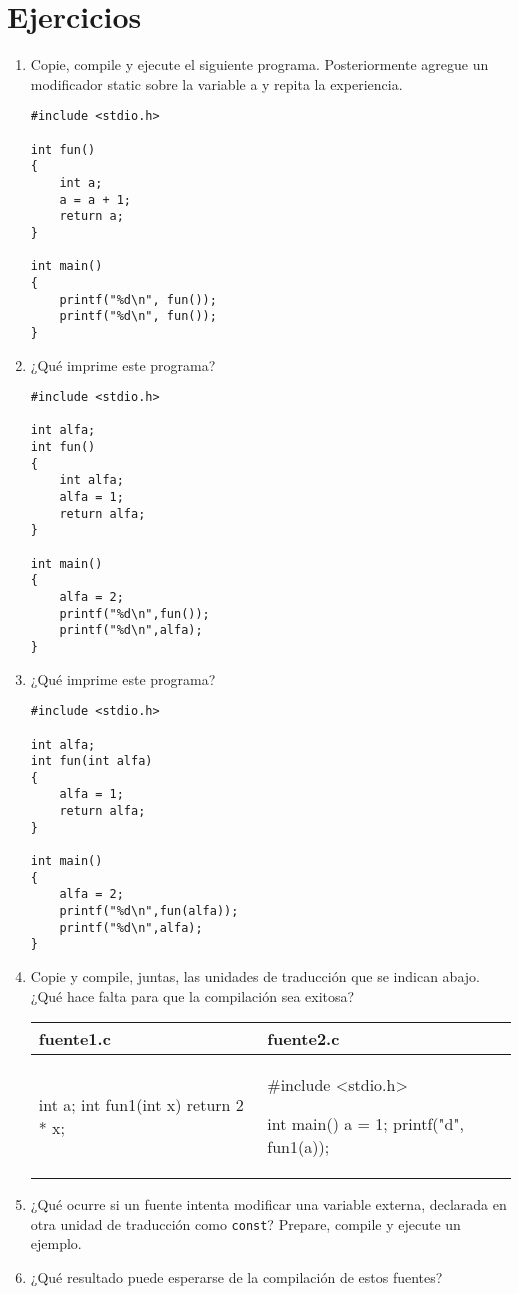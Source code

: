 \section{Ejercicios}
\label{sec:tc-variables-ej}
\begin{enumerate}
	\item Copie, compile y ejecute el siguiente programa. Posteriormente agregue un modificador static sobre
la variable a y repita la experiencia.
\begin{lstlisting}
#include <stdio.h>

int fun()
{
	int a;
	a = a + 1;
	return a;
}

int main()
{
	printf("%d\n", fun());
	printf("%d\n", fun());
}
\end{lstlisting}
\item ¿Qué imprime este programa?
\begin{lstlisting}
#include <stdio.h>

int alfa;
int fun()
{
	int alfa;
	alfa = 1;
	return alfa;
}

int main()
{
	alfa = 2;
	printf("%d\n",fun());
	printf("%d\n",alfa);
}
\end{lstlisting}
\item ¿Qué imprime este programa?
\begin{lstlisting}
#include <stdio.h>

int alfa;
int fun(int alfa)
{
	alfa = 1;
	return alfa;
}

int main()
{
	alfa = 2;
	printf("%d\n",fun(alfa));
	printf("%d\n",alfa);
}
\end{lstlisting}
 \item Copie y compile, juntas, las unidades de traducción que se indican abajo. ¿Qué hace falta para que
la compilación sea exitosa?

	
\begin{tabular}{p{4cm}|p{5cm}}
\hline
fuente1.c & fuente2.c\\
\hline
\begin{codecell}
int a;
int fun1(int x)
{
	return 2 * x;
}
\end{codecell}
&
\begin{codecell}
#include <stdio.h>

int main()
{
	a = 1;
	printf("d\n", fun1(a));
}
\end{codecell}
\\
\end{tabular} 

\item ¿Qué ocurre si un fuente intenta modificar una variable externa, declarada en otra unidad de
traducción como \lstinline{const}? Prepare, compile y ejecute un ejemplo.
\item ¿Qué resultado puede esperarse de la compilación de estos fuentes?


\end{enumerate}
